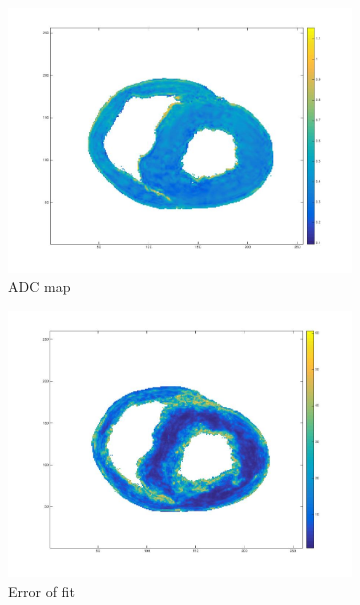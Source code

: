 \begin{figure}
    \begin{subfigure}{.31\textwidth}
        \includegraphics[width=\textwidth]{figures/pig25_adc_30}
        \caption{ADC map}
        \label{fig:pig25_adc}
    \end{subfigure}
    \begin{subfigure}{.31\textwidth}
        \includegraphics[width=\textwidth]{figures/pig25_err_30}
        \caption{Error of fit}
        \label{fig:pig25_err}
    \end{subfigure}
    \begin{subfigure}{.31\textwidth}

\end{subfigure}
\end{figure}
